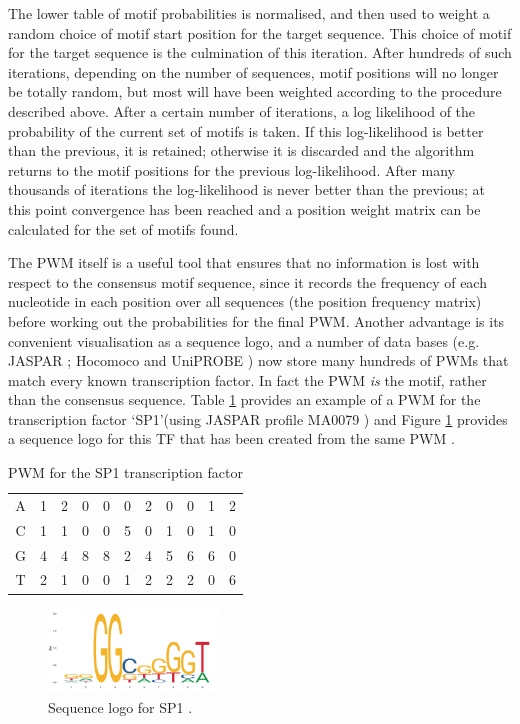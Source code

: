 \documentclass[12pt]{article}
\begin{document}
The lower table of motif probabilities is normalised, and then used to weight a random choice of motif start position for the target sequence. This choice of motif for the target sequence is the culmination of this iteration. After hundreds of such iterations, depending on the number of sequences, motif positions will no longer be totally random, but most will have been weighted according to the procedure described above. After a certain number of iterations, a log likelihood of the probability of the current set of motifs is taken. If this log-likelihood is better than the previous, it is retained; otherwise it is discarded and the algorithm returns to the motif positions for the previous log-likelihood. After many thousands of iterations the log-likelihood is never better than the previous; at this point convergence has been reached and a position weight matrix can be calculated for the set of motifs found.

The PWM itself is a useful tool that ensures that no information is lost with respect to the consensus motif sequence, since it records the frequency of each nucleotide in each position over all sequences (the position frequency matrix) before working out the probabilities for the final PWM. Another advantage is its convenient visualisation as a sequence logo, and a number of data bases (e.g. JASPAR \citep{Khan2018}; Hocomoco \citep{Kulakovskiy2018} and UniPROBE \citep{Hume2015}) now store many hundreds of PWMs that match every known transcription factor. In fact the PWM \textit{is} the motif, rather than the consensus sequence. Table \ref{pwmTable} provides an example of a PWM for the transcription factor `SP1'(using JASPAR profile MA0079 \citep{Khan2018}) and Figure \ref{pwm} provides a sequence logo for this TF that has been created from the same PWM \citep{Khan2018}.

\begin{table}[!htbp]
\centering
\caption{PWM for the SP1 transcription factor}
\label{pwmTable}
\begin{tabular}{c c c c c c c c c c c}
A & 1 & 2 & 0 & 0 & 0 & 2 & 0 & 0 & 1 & 2\\
C&1&1&0&0&5&0&1&0&1&0\\ 
G&4&4&8&8&2&4&5&6&6&0\\
T&2&1&0&0&1&2&2&2&0&6\\
\end{tabular}
\end{table}

\begin{figure}[htbp]
\centering 
     \includegraphics[width= 0.4\textwidth]{SP1Logo.pdf} 
    \caption{Sequence logo for SP1 \citep{Khan2018}.} 
    
    \label{pwm}
\end{figure}
\end{document}
